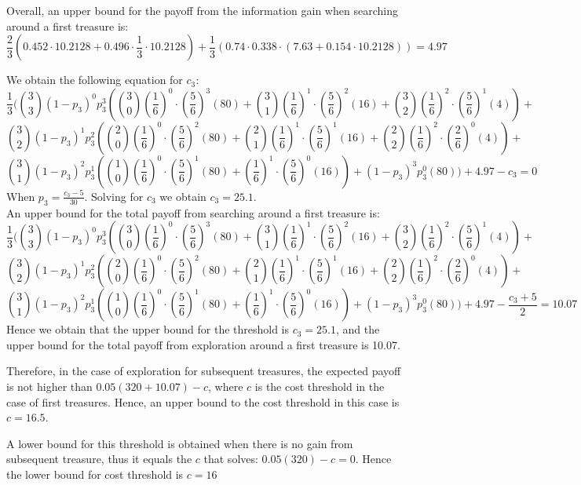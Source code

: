 Overall, an upper bound for the payoff from the information gain when searching around a first treasure is: $$\frac{2}{3}(0.452\cdot10.2128 + 0.496\cdot\frac{1}{3}\cdot10.2128) + 
 \frac{1}{3}(0.74\cdot0.338\cdot(7.63 + 0.154\cdot10.2128))=4.97$$
 
 We obtain the following equation for $c_3$: $$\frac{1}{3}(\binom{3}{3}(1-p_3)^0 p_3^3 ( \binom{3}{0}(\frac{1}{6})^0\cdot(\frac{5}{6})^3 (80) + 
       \binom{3}{1}(\frac{1}{6})^1\cdot(\frac{5}{6})^2 (16) + 
       \binom{3}{2}(\frac{1}{6})^2\cdot(\frac{5}{6})^1 (4)) + 
    $$$$\binom{3}{2}(1 - p_3)^1 p_3^2 (\binom{2}{0}(\frac{1}{6})^0\cdot(\frac{5}{6})^2 (80) + 
       \binom{2}{1}(\frac{1}{6})^1\cdot(\frac{5}{6})^1 (16) + 
       \binom{2}{2}(\frac{1}{6})^2\cdot(\frac{2}{6})^0 (4)) + 
$$$$\binom{3}{1} (1 - p_3)^2 p_3^1 (\binom{1}{0}(\frac{1}{6})^0\cdot(\frac{5}{6})^1 (80) + 
       (\frac{1}{6})^1\cdot(\frac{5}{6})^0 (16)) + (1 - 
       p_3)^3 p_3^0 (80))+4.97-c_3=0$$
When $p_3=\frac{c_3-5}{30}$. Solving for $c_3$ we obtain $c_3=25.1$. \\
An upper bound for the total payoff from searching around a first treasure is: $$\frac{1}{3}(\binom{3}{3}(1-p_3)^0 p_3^3 ( \binom{3}{0}(\frac{1}{6})^0\cdot(\frac{5}{6})^3 (80) + 
       \binom{3}{1}(\frac{1}{6})^1\cdot(\frac{5}{6})^2 (16) + 
       \binom{3}{2}(\frac{1}{6})^2\cdot(\frac{5}{6})^1 (4)) + 
    $$$$\binom{3}{2}(1 - p_3)^1 p_3^2 (\binom{2}{0}(\frac{1}{6})^0\cdot(\frac{5}{6})^2 (80) + 
       \binom{2}{1}(\frac{1}{6})^1\cdot(\frac{5}{6})^1 (16) + 
       \binom{2}{2}(\frac{1}{6})^2\cdot(\frac{2}{6})^0 (4)) + 
$$$$\binom{3}{1} (1 - p_3)^2 p_3^1 (\binom{1}{0}(\frac{1}{6})^0\cdot(\frac{5}{6})^1 (80) + 
       (\frac{1}{6})^1\cdot(\frac{5}{6})^0 (16)) + (1 - 
       p_3)^3 p_3^0 (80))+4.97-\frac{c_3+5}{2}=10.07$$
Hence we obtain that the upper bound for the threshold is $c_3=25.1$, and the upper bound for the total payoff from exploration around a first treasure is 10.07. 


Therefore, in the case of exploration for subsequent treasures, the expected payoff is not higher than $0.05(320+10.07)-c$, where $c$ is the cost threshold in the case of first treasures. Hence, an upper bound to the cost threshold in this case is $c=16.5$. 

A lower bound for this threshold is obtained when there is no gain from subsequent treasure, thus it equals the $c$ that solves: $0.05(320)-c=0$. Hence the lower bound for cost threshold is $c=16$